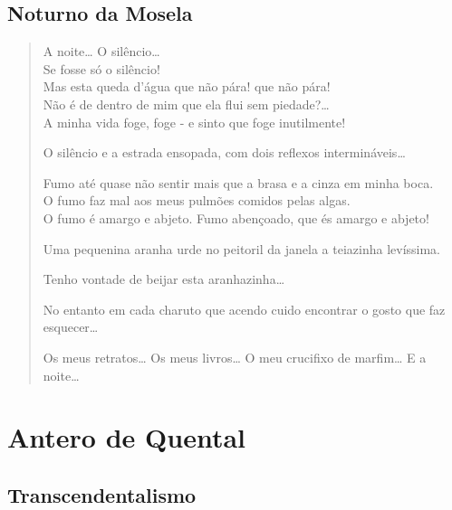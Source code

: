 \documentclass[10pt,a5paper,oneside]{book}
\begin{document}
\chapter{Noturno da Mosela}

\begin{verse}
A noite\ldots{} O silêncio\ldots{}\\
Se fosse só o silêncio!\\
Mas esta queda d'água que não pára! que não pára!\\
Não é de dentro de mim que ela flui sem piedade?\ldots{}\\
A minha vida foge, foge - e sinto que foge inutilmente!

O silêncio e a estrada ensopada, com dois reflexos intermináveis\ldots{}

Fumo até quase não sentir mais que a brasa e a cinza em minha boca.\\
O fumo faz mal aos meus pulmões comidos pelas algas.\\
O fumo é amargo e abjeto. Fumo abençoado, que és amargo e abjeto!

Uma pequenina aranha urde no peitoril da janela a teiazinha levíssima.

Tenho vontade de beijar esta aranhazinha\ldots{}

No entanto em cada charuto que acendo cuido encontrar o gosto que faz esquecer\ldots{}

Os meus retratos\ldots{} Os meus livros\ldots{} O meu crucifixo de marfim\ldots{}
E a noite\ldots{}
\end{verse}

\part{Antero de Quental}

\chapter{Transcendentalismo}
\end{document}
